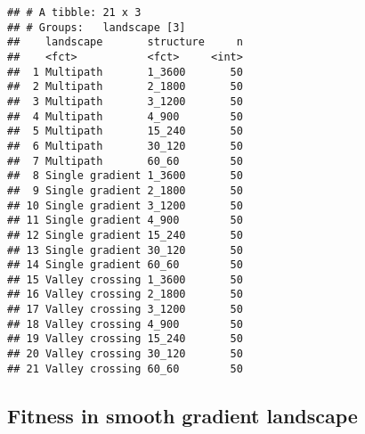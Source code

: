 \documentclass[
]{book}
\begin{document}
\begin{verbatim}
## # A tibble: 21 x 3
## # Groups:   landscape [3]
##    landscape       structure     n
##    <fct>           <fct>     <int>
##  1 Multipath       1_3600       50
##  2 Multipath       2_1800       50
##  3 Multipath       3_1200       50
##  4 Multipath       4_900        50
##  5 Multipath       15_240       50
##  6 Multipath       30_120       50
##  7 Multipath       60_60        50
##  8 Single gradient 1_3600       50
##  9 Single gradient 2_1800       50
## 10 Single gradient 3_1200       50
## 11 Single gradient 4_900        50
## 12 Single gradient 15_240       50
## 13 Single gradient 30_120       50
## 14 Single gradient 60_60        50
## 15 Valley crossing 1_3600       50
## 16 Valley crossing 2_1800       50
## 17 Valley crossing 3_1200       50
## 18 Valley crossing 4_900        50
## 19 Valley crossing 15_240       50
## 20 Valley crossing 30_120       50
## 21 Valley crossing 60_60        50
\end{verbatim}

\hypertarget{fitness-in-smooth-gradient-landscape-1}{%
\subsection{Fitness in smooth gradient landscape}\label{fitness-in-smooth-gradient-landscape-1}}
\end{document}
